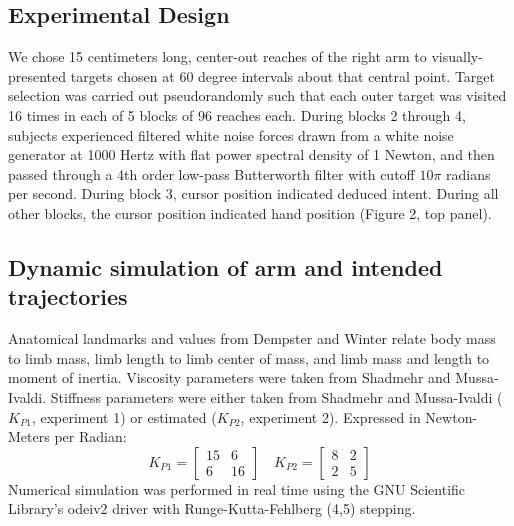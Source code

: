 \documentclass[letterpaper, 10 pt, conference]{ieeeconf}  %
\begin{document}
\subsection*{Experimental Design}
We chose 15 centimeters long, center-out reaches of the right arm to visually-presented targets chosen at 60 degree intervals about that central point. Target selection was carried out pseudorandomly such that each outer target was visited 16 times in each of 5 blocks of 96 reaches each. During blocks 2 through 4, subjects experienced filtered white noise forces drawn from a white noise generator at 1000 Hertz with flat power spectral density of 1 Newton, and then passed through a 4th order low-pass Butterworth filter with cutoff $10 \pi$ radians per second. During block 3, cursor position indicated deduced intent. During all other blocks, the cursor position indicated hand position (Figure 2, top panel).

\subsection*{Dynamic simulation of arm and intended trajectories}
Anatomical landmarks and values from Dempster \cite{dempster1955space} and Winter \cite{winter2009biomechanics} relate body mass to limb mass, limb length to limb center of mass, and limb mass and length to moment of inertia. Viscosity parameters were taken from Shadmehr and Mussa-Ivaldi\cite{shadmehr1994adaptive}. Stiffness parameters were either taken from Shadmehr and Mussa-Ivaldi\cite{shadmehr1994adaptive} ($K_{P1}$, experiment 1) or estimated ($K_{P2}$, experiment 2). Expressed in Newton-Meters per Radian:
\begin{equation}
K_{P1}=
\begin{bmatrix}
15 & 6 \\
6 & 16
\end{bmatrix}
\quad
K_{P2}=
\begin{bmatrix}
8 & 2 \\
2 & 5
\end{bmatrix}
\end{equation}
Numerical simulation was performed in real time using the GNU Scientific Library's odeiv2 driver with Runge-Kutta-Fehlberg (4,5) stepping\cite{gough2009gnu}.
\end{document}
